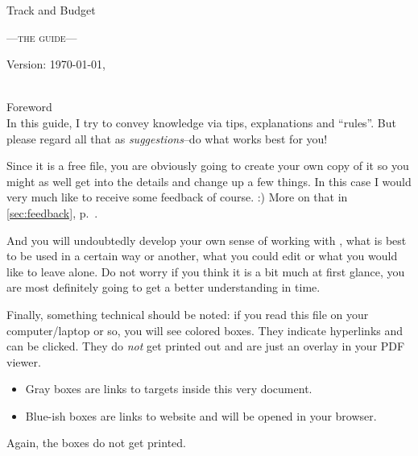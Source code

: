 
\begin{center}\LARGE
Track and Budget
\end{center}
\begin{center}\scshape\large\sffamily
	---the guide---
\end{center}

\vfill
\begin{center}
Version: \today, \thistime
\end{center}

\clearpage
~\\
\vfill
{\sffamily\centering Foreword\label{foreword}\\}
\small\singlespacing\rmfamily
In this guide, I try to convey knowledge via tips, explanations and ``rules''.
But please regard all that as \emph{suggestions}--do what works best for you!

Since it is a free file, you are obviously going to create your own copy of it so you might as well get into the details and change up a few things. In this case I would very much like to receive some feedback of course. :)
More on that in \autoref{sec:feedback}, p.~\pageref{sec:feedback}.

And you will undoubtedly develop your own sense of working with \tfn, what is best to be used in a certain way or another, what you could edit or what you would like to leave alone.
Do not worry if you think it is a bit much at first glance, you are most definitely going to get a better understanding in time.

Finally, something technical should be noted: if you read this file on your computer/laptop or so, you will see colored boxes.
They indicate hyperlinks and can be clicked.
They do \emph{not} get printed out and are just an overlay in your PDF viewer.
\begin{itemize}
	\item Gray boxes are links to targets inside this very document.
	\item Blue-ish boxes are links to website and will be opened in your browser.
\end{itemize}
Again, the boxes do not get printed.